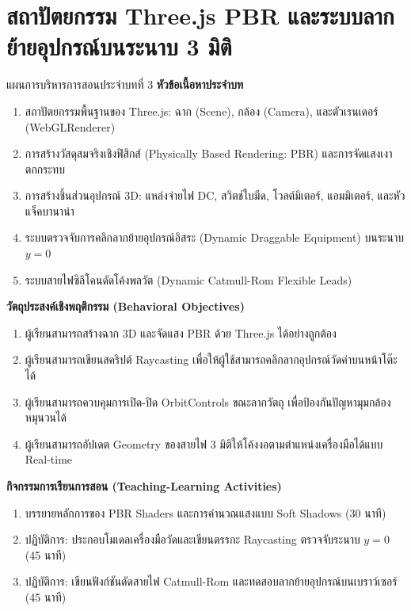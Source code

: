 \chapter{สถาปัตยกรรม Three.js PBR และระบบลากย้ายอุปกรณ์บนระนาบ 3 มิติ}
\label{chap:ch03}

\begin{teachingplan}{แผนการบริหารการสอนประจำบทที่ 3}
\noindent\textbf{หัวข้อเนื้อหาประจำบท}
\begin{enumerate}[leftmargin=1.5em, itemsep=2pt]
    \item สถาปัตยกรรมพื้นฐานของ Three.js: ฉาก (Scene), กล้อง (Camera), และตัวเรนเดอร์ (WebGLRenderer)
    \item การสร้างวัสดุสมจริงเชิงฟิสิกส์ (Physically Based Rendering: PBR) และการจัดแสงเงาตกกระทบ
    \item การสร้างชิ้นส่วนอุปกรณ์ 3D: แหล่งจ่ายไฟ DC, สวิตช์ใบมีด, โวลต์มิเตอร์, แอมมิเตอร์, และหัวแจ็คบานาน่า
    \item ระบบตรวจจับการคลิกลากย้ายอุปกรณ์อิสระ (Dynamic Draggable Equipment) บนระนาบ $y=0$
    \item ระบบสายไฟซิลิโคนดัดโค้งพลวัต (Dynamic Catmull-Rom Flexible Leads)
\end{enumerate}

\noindent\textbf{วัตถุประสงค์เชิงพฤติกรรม (Behavioral Objectives)}
\begin{enumerate}[leftmargin=1.5em, itemsep=2pt]
    \item ผู้เรียนสามารถสร้างฉาก 3D และจัดแสง PBR ด้วย Three.js ได้อย่างถูกต้อง
    \item ผู้เรียนสามารถเขียนสคริปต์ Raycasting เพื่อให้ผู้ใช้สามารถคลิกลากอุปกรณ์วัดค่าบนหน้าโต๊ะได้
    \item ผู้เรียนสามารถควบคุมการเปิด-ปิด OrbitControls ขณะลากวัตถุ เพื่อป้องกันปัญหามุมกล้องหมุนวนได้
    \item ผู้เรียนสามารถอัปเดต Geometry ของสายไฟ 3 มิติให้โค้งงอตามตำแหน่งเครื่องมือได้แบบ Real-time
\end{enumerate}

\noindent\textbf{กิจกรรมการเรียนการสอน (Teaching-Learning Activities)}
\begin{enumerate}[leftmargin=1.5em, itemsep=2pt]
    \item บรรยายหลักการของ PBR Shaders และการคำนวณแสงแบบ Soft Shadows (30 นาที)
    \item ปฏิบัติการ: ประกอบโมเดลเครื่องมือวัดและเขียนตรรกะ Raycasting ตรวจจับระนาบ $y=0$ (45 นาที)
    \item ปฏิบัติการ: เขียนฟังก์ชันดัดสายไฟ Catmull-Rom และทดสอบลากย้ายอุปกรณ์บนเบราว์เซอร์ (45 นาที)
\end{enumerate}


\end{teachingplan}
